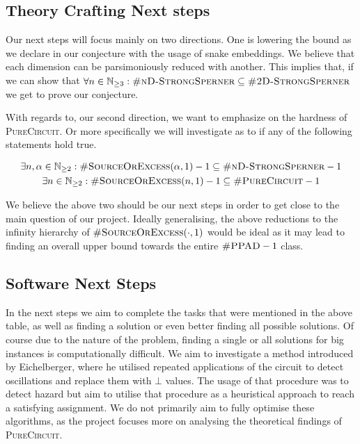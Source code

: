 \subsection{Theory Crafting Next steps}

Our next steps will focus mainly on two directions. One is lowering the bound as we declare in our conjecture with the
usage of snake embeddings. We believe that each dimension can be parsimoniously reduced with another. This implies
that, if we can show that $\forall n \in \mathbb{N}_{\geq 3}: \textsc{\#nD-StrongSperner} \subseteq \textsc{\#2D-StrongSperner}$
we get to prove our conjecture.


With regards to, our second direction, we want to emphasize on the hardness of \textsc{PureCircuit}.
Or more specifically we will investigate as to if any of the following statements hold true.

\begin{gather*}
    \exists n, \alpha \in \mathbb{N}_{\geq 2}:
    \textsc{\#SourceOrExcess}(\alpha,1) - 1  \subseteq \textsc{\#nD-StrongSperner} -1 \\
    \exists n \in \mathbb{N}_{\geq 2}: \textsc{\#SourceOrExcess}(n,1) - 1 \subseteq \textsc{\#PureCircuit} -1 \\
\end{gather*}

We believe the above two should be our next steps in order to get close to the main question of our project.
Ideally generalising, the above reductions to the infinity hierarchy of
$\textsc{\#SourceOrExcess}(\cdot,1)$ would be ideal as it may lead to finding an overall upper bound
towards the entire $\textsc{\#PPAD} -1$ class.


\subsection{Software Next Steps}

In the next steps we aim to complete the tasks that were mentioned in the above table,
as well as finding a solution or even better finding all possible solutions. Of
course due to the nature of the problem, finding a single or all solutions for big instances
is computationally difficult. We aim to investigate a method introduced by Eichelberger, where
he utilised repeated applications of the circuit to detect oscillations and replace them with
$\bot$ values. The usage of that procedure was to detect hazard but aim to utilise that procedure
as a heuristical approach to reach a satisfying assignment. We do not primarily aim
to fully optimise these algorithms, as the project focuses more on analysing the theoretical findings
of \textsc{PureCircuit}.


